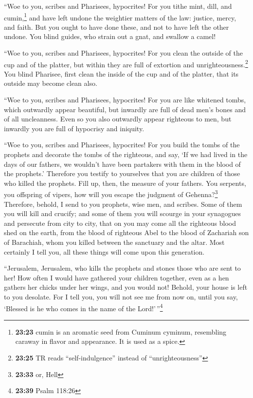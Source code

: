  ``Woe to you, scribes and Pharisees, hypocrites! For you
tithe mint, dill, and cumin,\footnote{\textbf{23:23} cumin is an
  aromatic seed from Cuminum cyminum, resembling caraway in flavor and
  appearance. It is used as a spice.} and have left undone the weightier
matters of the law: justice, mercy, and faith. But you ought to have
done these, and not to have left the other undone.  You
blind guides, who strain out a gnat, and swallow a camel!

 ``Woe to you, scribes and Pharisees, hypocrites! For you
clean the outside of the cup and of the platter, but within they are
full of extortion and unrighteousness.\footnote{\textbf{23:25} TR reads
  ``self-indulgence'' instead of ``unrighteousness''} 
You blind Pharisee, first clean the inside of the cup and of the
platter, that its outside may become clean also.

 ``Woe to you, scribes and Pharisees, hypocrites! For you
are like whitened tombs, which outwardly appear beautiful, but inwardly
are full of dead men's bones and of all uncleanness. 
Even so you also outwardly appear righteous to men, but inwardly you are
full of hypocrisy and iniquity.

 ``Woe to you, scribes and Pharisees, hypocrites! For you
build the tombs of the prophets and decorate the tombs of the righteous,
 and say, `If we had lived in the days of our fathers, we
wouldn't have been partakers with them in the blood of the prophets.'
 Therefore you testify to yourselves that you are
children of those who killed the prophets.  Fill up,
then, the measure of your fathers.  You serpents, you
offspring of vipers, how will you escape the judgment of
Gehenna?\footnote{\textbf{23:33} or, Hell}  Therefore,
behold, I send to you prophets, wise men, and scribes. Some of them you
will kill and crucify; and some of them you will scourge in your
synagogues and persecute from city to city,  that on you
may come all the righteous blood shed on the earth, from the blood of
righteous Abel to the blood of Zachariah son of Barachiah, whom you
killed between the sanctuary and the altar.  Most
certainly I tell you, all these things will come upon this generation.

 ``Jerusalem, Jerusalem, who kills the prophets and
stones those who are sent to her! How often I would have gathered your
children together, even as a hen gathers her chicks under her wings, and
you would not!  Behold, your house is left to you
desolate.  For I tell you, you will not see me from now
on, until you say, `Blessed is he who comes in the name of the
Lord!'\,''\footnote{\textbf{23:39} Psalm 118:26}

